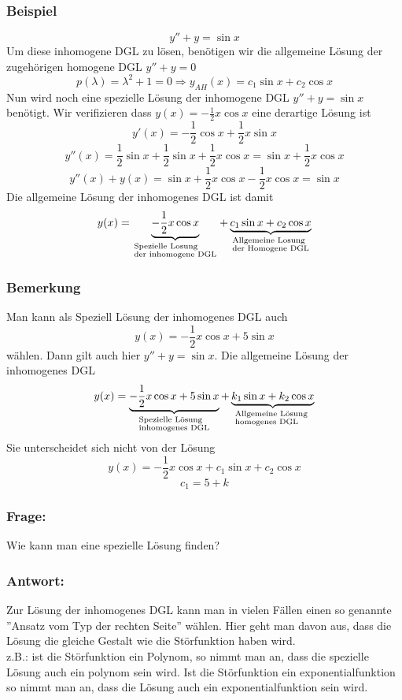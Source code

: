 \subsubsection*{Beispiel}
$$y''+y=\sin x$$
Um diese inhomogene DGL zu lösen, benötigen wir die allgemeine Lösung der zugehörigen homogene DGL $y''+y=0$$$p(\lambda)=\lambda^2+1=0\Rightarrow y_{AH}(x)=c_1\sin x+c_2\cos x$$ Nun wird noch eine spezielle Lösung der inhomogene DGL $y''+y=\sin x$ benötigt. Wir verifizieren dass $y(x)=-\frac{1}{2}x\cos x$ eine derartige Lösung ist
$$y'(x)=-\frac{1}{2}\cos x+\frac{1}{2}x\sin x$$
$$y''(x)=\frac{1}{2}\sin x+\frac{1}{2}\sin x+\frac{1}{2}x\cos x=\sin x+\frac{1}{2}x\cos x$$
$$y''(x)+y(x)=\sin x+\frac{1}{2}x\cos x-\frac{1}{2}x\cos x=\sin x$$ Die allgemeine Lösung der inhomogenes DGL ist damit $$y(x) = \underbrace { - \frac{1}{2}x\cos x}_{\scriptstyle{\text{Spezielle Losung }}\hfill\atop
\scriptstyle{\text{der inhomogene DGL}}\hfill} + \underbrace {{c_1}\sin x + {c_2}\cos x}_{\scriptstyle{\text{Allgemeine Losung }}\hfill\atop
\scriptstyle{\text{der Homogene DGL}}\hfill}$$
\subsubsection*{Bemerkung}
Man kann als Speziell Lösung der inhomogenes DGL auch $$y(x)=-\frac{1}{2}x\cos x+5\sin x$$ wählen. Dann gilt auch hier $y''+y=\sin x$. Die allgemeine Lösung der inhomogenes DGL 
$$y(x) = \underbrace { - \frac{1}{2}x\cos x + 5\sin x}_{\scriptstyle{\text{Spezielle Lösung }}\hfill\atop
\scriptstyle{\text{inhomogenes DGL}}\hfill} + \underbrace {{k_1}\sin x + {k_2}\cos x}_{\scriptstyle{\text{Allgemeine Lösung }}\hfill\atop
\scriptstyle{\text{homogenes DGL}}\hfill}$$ Sie unterscheidet sich nicht von der Lösung $$y(x)=-\frac{1}{2}x\cos x+c_1\sin x+c_2\cos x$$$$c_1=5+k$$
\subsubsection*{Frage:}
Wie kann man eine spezielle Lösung finden?
\subsubsection*{Antwort:}
Zur Lösung der inhomogenes DGL kann man in vielen Fällen einen so genannte ''Ansatz vom Typ der rechten Seite'' wählen. Hier geht man davon aus, dass die Lösung die gleiche Gestalt wie die Störfunktion haben wird.\\

\noindent z.B.: ist die Störfunktion ein Polynom, so nimmt man an, dass die spezielle Lösung auch ein polynom sein wird. Ist die Störfunktion ein exponentialfunktion so nimmt man an, dass die Lösung auch ein exponentialfunktion sein wird.

